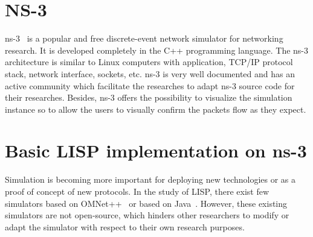 \section{NS-3}
\label{sec:ns3_ns3}
ns-3~\cite{ns3} is a popular and free discrete-event network simulator for networking research. It is developed completely in the C++ programming language. %
The ns-3 architecture is similar to Linux computers with application, TCP/IP protocol stack, network interface, sockets, etc. ns-3 is very well documented and has an active community which facilitate the researches to adapt ns-3 source code for their researches. Besides, ns-3 offers the possibility to visualize the simulation instance so to allow the users to visually confirm the packets flow as they expect. 

\section{Basic LISP implementation on ns-3}
\label{sec:ns3_basic_lisp}
Simulation is becoming more important for deploying new technologies or as a proof of concept of new protocols. In the study of LISP, there exist few simulators based on OMNet++~\cite{vesely2015locator, vesely2014multicast, klein2012integration} or based on Java~\cite{stockmayer2016jlisp}. However, these existing simulators are not open-source, which hinders other researchers to modify or adapt the simulator with respect to their own research purposes.


